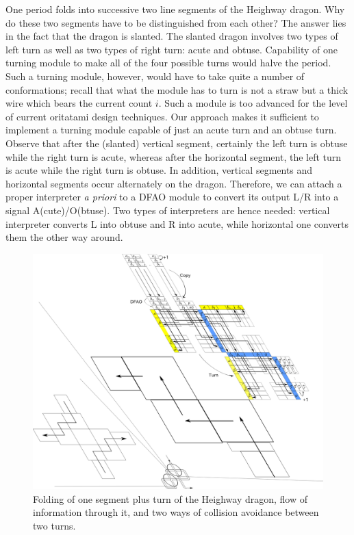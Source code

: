 One period folds into successive two line segments of the Heighway dragon. 
Why do these two segments have to be distinguished from each other? 
The answer lies in the fact that the dragon is slanted. 
The slanted dragon involves two types of left turn as well as two types of right turn: acute and obtuse. 
Capability of one turning module to make all of the four possible turns would halve the period. 
Such a turning module, however, would have to take quite a number of conformations; recall that what the module has to turn is not a straw but a thick wire which bears the current count $i$. 
Such a module is too advanced for the level of current oritatami design techniques.  
Our approach makes it sufficient to implement a turning module capable of just an acute turn and an obtuse turn. 
Observe that after the (slanted) vertical segment, certainly the left turn is obtuse while the right turn is acute, whereas after the horizontal segment, the left turn is acute while the right turn is obtuse. 
In addition, vertical segments and horizontal segments occur alternately on the dragon. 
Therefore, we can attach a proper interpreter \textit{a priori} to a DFAO module to convert its output L/R into a signal A(cute)/O(btuse). 
Two types of interpreters are hence needed: vertical interpreter converts L into obtuse and R into acute, while horizontal one converts them the other way around. 

\begin{figure}[tb]
\includegraphics[width=\linewidth]{pic/dragon_vol4.pdf}
\caption{
Folding of one segment plus turn of the Heighway dragon, flow of information through it, and two ways of collision avoidance between two turns.
}
\label{fig:abst_dragon}
\end{figure}


